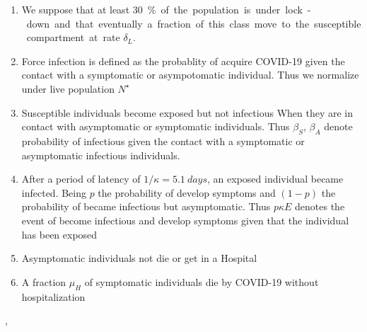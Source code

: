 \begin{hypotheses}
    \begin{enumerate}[(H-1)]
        \item
            We suppose that at least \SI{30}\percent  of the population is
            under lock-down and that eventually a fraction of this class move
            to the susceptible compartment at rate $\delta_L$.
        \item
            Force infection is defined as the probablity of acquire COVID-19
            given the contact with a symptomatic or asympotomatic individual.
            Thus we normalize under live population
            $
                N^{\star}
            $
        \item
            Susceptible individuals become
            exposed but not infectious
            When they are in contact with asymptomatic or symptomatic
            individuals. Thus $\beta_S$, $\beta_A$ denote
            probability of infectious given the contact with a symptomatic or
            asymptomatic infectious individuals.
        \item
            After a period of latency of $1/\kappa = \SI{5.1}{days}$, an
            exposed individual became infected. Being $p$ the probability of
            develop symptoms and $(1-p)$ the probability of became infectious
            but asymptomatic. Thus $p\kappa E$ denotes the
            event of become infectious and develop symptoms given that the
            individual has been exposed
        \item
            Asymptomatic individuals not die or get in a Hospital
        \item
            A fraction $\mu_{H}$ of symptomatic individuals
            die by COVID-19 without hospitalization
    \end{enumerate}



,
\end{hypotheses}




